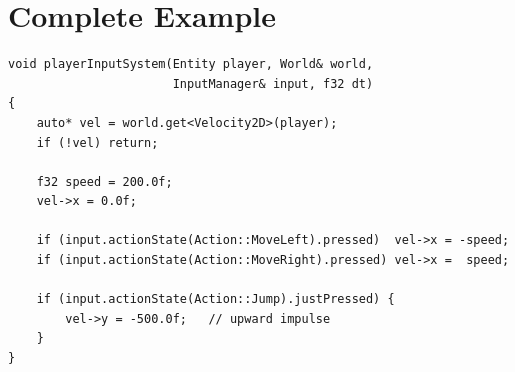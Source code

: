 \section{Complete Example}

\begin{lstlisting}
void playerInputSystem(Entity player, World& world,
                       InputManager& input, f32 dt)
{
    auto* vel = world.get<Velocity2D>(player);
    if (!vel) return;

    f32 speed = 200.0f;
    vel->x = 0.0f;

    if (input.actionState(Action::MoveLeft).pressed)  vel->x = -speed;
    if (input.actionState(Action::MoveRight).pressed) vel->x =  speed;

    if (input.actionState(Action::Jump).justPressed) {
        vel->y = -500.0f;   // upward impulse
    }
}
\end{lstlisting}
